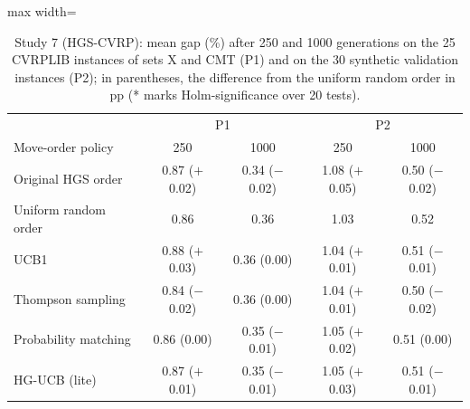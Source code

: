 \begin{table}[t]
\caption{Study 7 (HGS-CVRP): mean gap (\%) after 250 and 1000 generations on the 25 CVRPLIB instances of sets X and CMT (P1) and on the 30 synthetic validation instances (P2); in parentheses, the difference from the uniform random order in pp (* marks Holm-significance over 20 tests).}\label{tab:s7}
\centering
\small
\begin{adjustbox}{max width=\linewidth}
\begin{tabular}{lcccc}
\toprule
 & \multicolumn{2}{c}{P1} & \multicolumn{2}{c}{P2} \\ Move-order policy & 250 & 1000 & 250 & 1000 \\
\midrule
Original HGS order & 0.87 ($+$0.02) & 0.34 ($-$0.02) & 1.08 ($+$0.05) & 0.50 ($-$0.02) \\
Uniform random order & 0.86 & 0.36 & 1.03 & 0.52 \\
UCB1 & 0.88 ($+$0.03) & 0.36 (0.00) & 1.04 ($+$0.01) & 0.51 ($-$0.01) \\
Thompson sampling & 0.84 ($-$0.02) & 0.36 (0.00) & 1.04 ($+$0.01) & 0.50 ($-$0.02) \\
Probability matching & 0.86 (0.00) & 0.35 ($-$0.01) & 1.05 ($+$0.02) & 0.51 (0.00) \\
HG-UCB (lite) & 0.87 ($+$0.01) & 0.35 ($-$0.01) & 1.05 ($+$0.03) & 0.51 ($-$0.01) \\
\bottomrule
\end{tabular}
\end{adjustbox}
\end{table}
